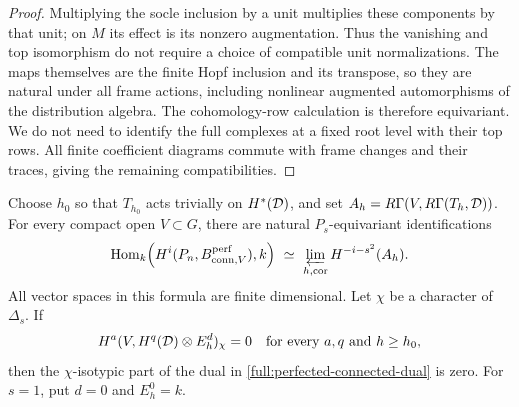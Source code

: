 \begin{proof}
Multiplying the socle inclusion by a unit multiplies these
components by that unit; on $M$ its effect is its nonzero
augmentation.  Thus the vanishing and top isomorphism do
not require a choice of compatible unit normalizations.
The maps themselves are the finite Hopf inclusion and its
transpose, so they are natural under all frame actions,
including nonlinear augmented automorphisms of the distribution
algebra.  The cohomology-row calculation is therefore
equivariant.  We do not need to identify the full complexes
at a fixed root level with their top rows.
All finite coefficient diagrams commute with frame changes and
their traces, giving the remaining compatibilities.
\end{proof}

\begin{lemma}
\label{full:perfected-connected-calculation}
Choose $h_0$ so that $T_{h_0}$ acts trivially on $H^*(\mathcal D)$,
and set $A_h=R\Gamma(V,R\Gamma(T_h,\mathcal D))$.
For every compact open $V\subset G$, there are natural
$P_s$-equivariant identifications
\begin{equation}
\label{full:perfected-connected-dual}
 \operatorname{Hom}_k\!\left(
     H^i(P_n,B_{\mathrm{conn},V}^{\mathrm{perf}}),k\right)
 \ \simeq\
 \varprojlim_{h,\operatorname{cor}} H^{-i-s^2}(A_h).
\end{equation}
All vector spaces in this formula are finite dimensional.
Let $\chi$ be a character of $\Delta_s$.
If
\begin{equation}
\label{full:top-row-character-test}
 H^a(V,H^q(\mathcal D)\otimes E_h^d)_\chi=0
       \quad\text{for every }a,q\text{ and }h\geq h_0,
\end{equation}
then the $\chi$-isotypic part of the dual in
\eqref{full:perfected-connected-dual} is zero.
For $s=1$, put $d=0$ and $E_h^0=k$.
\end{lemma}

